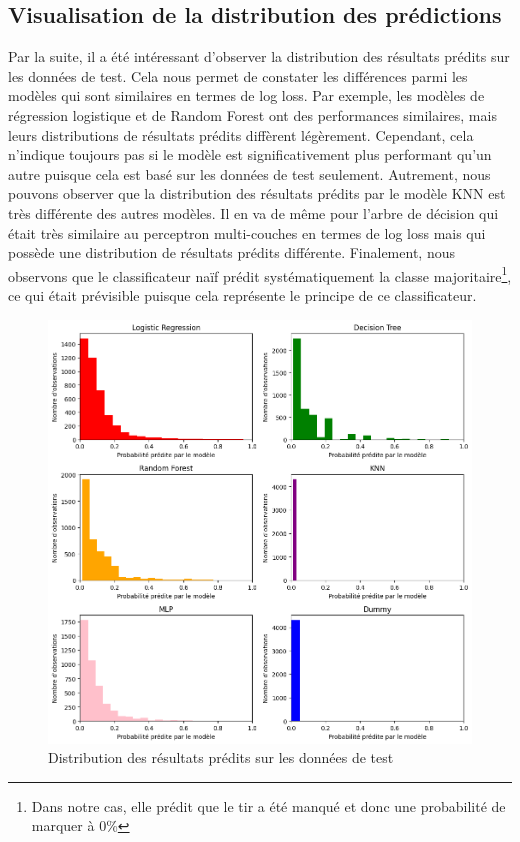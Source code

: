 \documentclass[12pt]{article}
\begin{document}
\subsection{Visualisation de la distribution des prédictions}
Par la suite, il a été intéressant d'observer la distribution des résultats prédits sur les données de test.
Cela nous permet de constater les différences parmi les modèles qui sont similaires en termes de log loss.
Par exemple, les modèles de régression logistique et de Random Forest ont des performances similaires, mais leurs distributions de résultats prédits diffèrent légèrement.
Cependant, cela n'indique toujours pas si le modèle est significativement plus performant qu'un autre puisque cela est basé sur les données de test seulement.
Autrement, nous pouvons observer que la distribution des résultats prédits par le modèle KNN est très différente des autres modèles.
Il en va de même pour l'arbre de décision qui était très similaire au perceptron multi-couches en termes de log loss mais qui possède une distribution de résultats prédits différente.
\newline\newline
Finalement, nous observons que le classificateur naïf prédit systématiquement la classe majoritaire\footnote{Dans notre cas, elle prédit que le tir a été manqué et donc une probabilité de marquer à 0\%}, ce qui était prévisible puisque cela représente le principe de ce classificateur.
\begin{figure}[htp]
    \centering
    \includegraphics[width=\textwidth]{img/distributions_result_from_models.png}
    \caption{Distribution des résultats prédits sur les données de test}
    \label{fig:results}
\end{figure}
\end{document}
